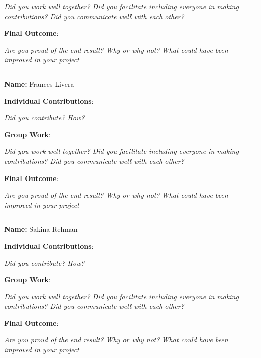 \documentclass[report.tex]{subfiles}
\begin{document}
\noindent \emph{Did you work well together? Did you facilitate including everyone in making contributions? Did you communicate well with each other?} \newline

\noindent \textbf{Final Outcome}:

\noindent \emph{Are you proud of the end result? Why or why not? What could have been improved in your project} \newline

\noindent\rule{17cm}{0.4pt}

\noindent \textbf{Name:} Frances Livera \newline

\noindent \textbf{Individual Contributions}:

\noindent \emph{Did you contribute? How?} \newline

\noindent \textbf{Group Work}:

\noindent \emph{Did you work well together? Did you facilitate including everyone in making contributions? Did you communicate well with each other?} \newline

\noindent \textbf{Final Outcome}:

\noindent \emph{Are you proud of the end result? Why or why not? What could have been improved in your project} \newline

\noindent\rule{17cm}{0.4pt}

\noindent \textbf{Name:} Sakina Rehman \newline

\noindent \textbf{Individual Contributions}:

\noindent \emph{Did you contribute? How?} \newline

\noindent \textbf{Group Work}:

\noindent \emph{Did you work well together? Did you facilitate including everyone in making contributions? Did you communicate well with each other?} \newline

\noindent \textbf{Final Outcome}:

\noindent \emph{Are you proud of the end result? Why or why not? What could have been improved in your project} \newline
\end{document}
